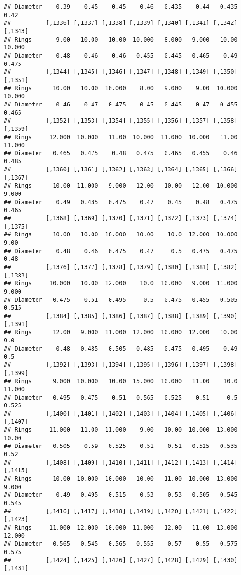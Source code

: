 \documentclass[
]{article}
\begin{document}
\begin{verbatim}
## Diameter    0.39    0.45    0.45    0.46   0.435    0.44   0.435    0.42
##          [,1336] [,1337] [,1338] [,1339] [,1340] [,1341] [,1342] [,1343]
## Rings       9.00   10.00   10.00  10.000   8.000   9.000   10.00  10.000
## Diameter    0.48    0.46    0.46   0.455   0.445   0.465    0.49   0.475
##          [,1344] [,1345] [,1346] [,1347] [,1348] [,1349] [,1350] [,1351]
## Rings      10.00   10.00  10.000    8.00   9.000    9.00  10.000  10.000
## Diameter    0.46    0.47   0.475    0.45   0.445    0.47   0.455   0.465
##          [,1352] [,1353] [,1354] [,1355] [,1356] [,1357] [,1358] [,1359]
## Rings     12.000  10.000   11.00  10.000  11.000  10.000   11.00  11.000
## Diameter   0.465   0.475    0.48   0.475   0.465   0.455    0.46   0.485
##          [,1360] [,1361] [,1362] [,1363] [,1364] [,1365] [,1366] [,1367]
## Rings      10.00  11.000   9.000   12.00   10.00   12.00  10.000   9.000
## Diameter    0.49   0.435   0.475    0.47    0.45    0.48   0.475   0.465
##          [,1368] [,1369] [,1370] [,1371] [,1372] [,1373] [,1374] [,1375]
## Rings      10.00   10.00  10.000   10.00    10.0  12.000  10.000    9.00
## Diameter    0.48    0.46   0.475    0.47     0.5   0.475   0.475    0.48
##          [,1376] [,1377] [,1378] [,1379] [,1380] [,1381] [,1382] [,1383]
## Rings     10.000   10.00  12.000    10.0  10.000   9.000  11.000   9.000
## Diameter   0.475    0.51   0.495     0.5   0.475   0.455   0.505   0.515
##          [,1384] [,1385] [,1386] [,1387] [,1388] [,1389] [,1390] [,1391]
## Rings      12.00   9.000  11.000  12.000  10.000  12.000   10.00     9.0
## Diameter    0.48   0.485   0.505   0.485   0.475   0.495    0.49     0.5
##          [,1392] [,1393] [,1394] [,1395] [,1396] [,1397] [,1398] [,1399]
## Rings      9.000  10.000   10.00  15.000  10.000   11.00    10.0  11.000
## Diameter   0.495   0.475    0.51   0.565   0.525    0.51     0.5   0.525
##          [,1400] [,1401] [,1402] [,1403] [,1404] [,1405] [,1406] [,1407]
## Rings     11.000   11.00  11.000    9.00   10.00  10.000  13.000   10.00
## Diameter   0.505    0.59   0.525    0.51    0.51   0.525   0.535    0.52
##          [,1408] [,1409] [,1410] [,1411] [,1412] [,1413] [,1414] [,1415]
## Rings      10.00  10.000  10.000   10.00   11.00  10.000  13.000   9.000
## Diameter    0.49   0.495   0.515    0.53    0.53   0.505   0.545   0.545
##          [,1416] [,1417] [,1418] [,1419] [,1420] [,1421] [,1422] [,1423]
## Rings     11.000  12.000  10.000  11.000   12.00   11.00  13.000  12.000
## Diameter   0.565   0.545   0.565   0.555    0.57    0.55   0.575   0.575
##          [,1424] [,1425] [,1426] [,1427] [,1428] [,1429] [,1430] [,1431]

\end{verbatim}
\end{document}
